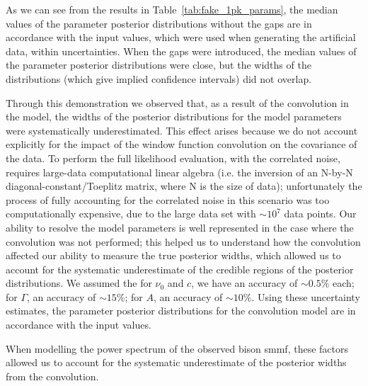 As we can see from the results in Table~\ref{tab:fake_1pk_params}, the median values of the parameter posterior distributions without the gaps are in accordance with the input values, which were used when generating the artificial data, within uncertainties. When the gaps were introduced, the median values of the parameter posterior distributions were close, but the widths of the distributions (which give implied confidence intervals) did not overlap. %

Through this demonstration we observed that, as a result of the convolution in the model, the widths of the posterior distributions for the model parameters were systematically underestimated. This effect arises because we do not account explicitly for the impact of the window function convolution on the covariance of the data. To perform the full likelihood evaluation, with the correlated noise, requires large-data computational linear algebra (i.e. the inversion of an N-by-N diagonal-constant/Toeplitz matrix, where N is the size of data); unfortunately the process of fully accounting for the correlated noise in this scenario was too computationally expensive, due to the large data set with $\sim 10^7$ data points. Our ability to resolve the model parameters is well represented in the case where the convolution was not performed; this helped us to understand how the convolution affected our ability to measure the true posterior widths, which allowed us to account for the systematic underestimate of the credible regions of the posterior distributions. We assumed the for $\nu_0$ and $c$, we have an accuracy of $\sim 0.5\%$ each; for $\Gamma$, an accuracy of $\sim 15\%$; for $A$, an accuracy of $\sim 10\%$. Using these uncertainty estimates, the parameter posterior distributions for the convolution model are in accordance with the input values.

When modelling the power spectrum of the observed \gls{bison} \gls{smmf}, these factors allowed us to account for the systematic underestimate of the posterior widths from the convolution.




